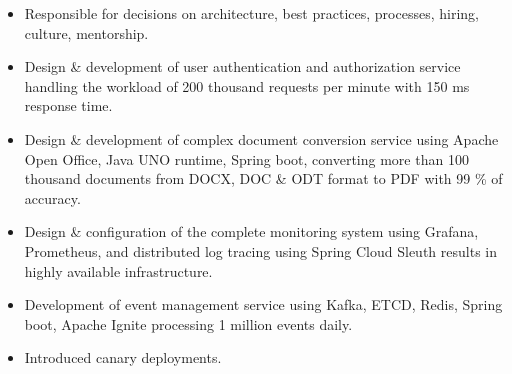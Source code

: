 \documentclass[10pt,a4paper,ragged2e]{altacv}
\begin{document}

\begin{fullwidth}\makecvheader
\end{fullwidth}



\begin{itemize}
\item Responsible for decisions on architecture, best practices, processes, hiring, culture, mentorship.
\item Design \& development of user authentication and authorization service handling the workload of 200 thousand requests per minute with 150 ms response time. 
\item Design \& development of complex document conversion service using Apache Open Office, Java UNO runtime, Spring boot,  converting more than 100 thousand documents from DOCX, DOC \& ODT format to PDF with 99 \% of accuracy.
\item Design \& configuration of the complete monitoring system using Grafana, Prometheus, and distributed log tracing using Spring Cloud Sleuth results in highly available infrastructure.
\item Development of event management service using  Kafka, ETCD, Redis, Spring boot, Apache Ignite  processing 1 million events daily.
\item Introduced canary deployments.

\end{itemize}
\end{document}
